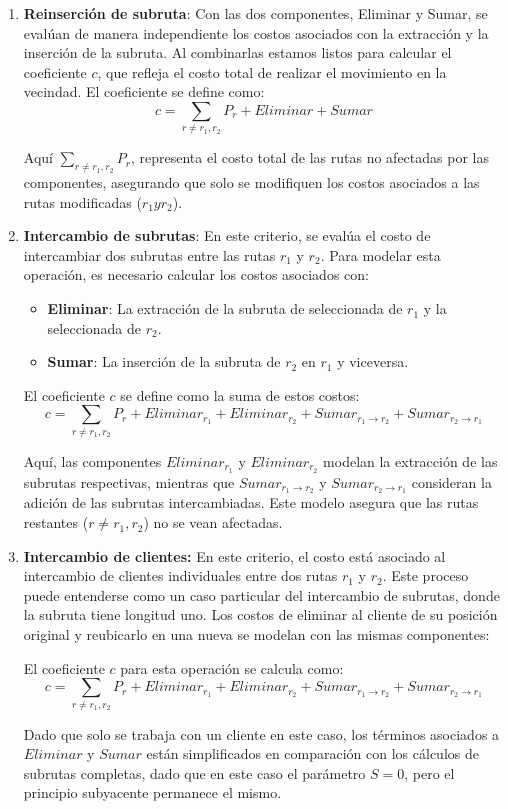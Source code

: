 \documentclass{article}
\begin{document}
\begin{enumerate}

\item \textbf{Reinserción de subruta}:
Con las dos componentes, Eliminar y Sumar, se evalúan de manera independiente los costos asociados con la extracción y la inserción de la subruta. Al combinarlas estamos listos para calcular el coeficiente $c$, que refleja el costo total de realizar el movimiento en la vecindad. El coeficiente se define como:
\[
c= \sum \limits _{r\neq r_1,r_2} P_r + Eliminar + Sumar
\]

Aquí $\sum \limits _{r\neq r_1,r_2} P_r$, representa el costo total de las rutas no afectadas por las componentes, asegurando que solo se modifiquen los costos asociados a las rutas modificadas ($r_1 y r_2$). 

\item \textbf {Intercambio de subrutas}:
En este criterio, se evalúa el costo de intercambiar dos subrutas entre las rutas $r_1$ y $r_2$. Para modelar esta operación, es necesario calcular los costos asociados con:  
\begin{itemize}
\item \textbf{Eliminar}: La extracción de la subruta de seleccionada de $r_1$ y la seleccionada de $r_2$.  
\item \textbf{Sumar}: La inserción de la subruta de $r_2$ en $r_1$ y viceversa.  
\end{itemize}

El coeficiente $c$ se define como la suma de estos costos:  
\[
c = \sum \limits _{r\neq r_1,r_2} P_r + Eliminar_{r_1} + Eliminar_{r_2} + Sumar_{r_1 \to r_2} + Sumar_{r_2 \to r_1} 
\]

Aquí, las componentes $Eliminar_{r_1}$ y $Eliminar_{r_2}$ modelan la extracción de las subrutas respectivas, mientras que $Sumar_{r_1 \to r_2}$ y $Sumar_{r_2 \to r_1}$ consideran la adición de las subrutas intercambiadas. Este modelo asegura que las rutas restantes ($r \neq r_1, r_2$) no se vean afectadas.  


\item \textbf {Intercambio de clientes:}
En este criterio, el costo está asociado al intercambio de clientes individuales entre dos rutas $r_1$ y $r_2$. Este proceso puede entenderse como un caso particular del intercambio de subrutas, donde la subruta tiene longitud uno. Los costos de eliminar al cliente de su posición original y reubicarlo en una nueva se modelan con las mismas componentes:  

El coeficiente $c$ para esta operación se calcula como:  
\[
c = \sum \limits _{r\neq r_1,r_2} P_r + Eliminar_{r_1} + Eliminar_{r_2} + Sumar_{r_1 \to r_2} + Sumar_{r_2 \to r_1} 
\]

Dado que solo se trabaja con un cliente en este caso, los términos asociados a $Eliminar$ y $Sumar$ están simplificados en comparación con los cálculos de subrutas completas, dado que en este caso el parámetro $S=0$, pero el principio subyacente permanece el mismo.
\end{enumerate}
\end{document}
